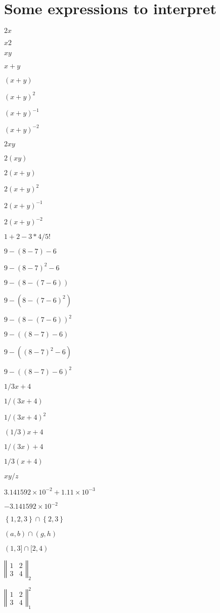 \documentclass{article}
\begin{document}
\section{Some expressions to interpret}

$2x$

$x2$

$xy$

$x+y$

$(x+y)$

$(x+y)^{2}$

$(x+y)^{-1}$

$(x+y)^{-2}$

$2xy$

$2(xy)$

$2(x+y)$

$2(x+y)^{2}$

$2(x+y)^{-1}$

$2(x+y)^{-2}$

$1+2-3\ast 4/5!$

$9-(8-7)-6$

$9-(8-7)^{2}-6$

$9-(8-(7-6))$

$9-(8-(7-6)^{2})$

$9-(8-(7-6))^{2}$

$9-((8-7)-6)$

$9-((8-7)^{2}-6)$

$9-((8-7)-6)^{2}$

$1/3x+4$

$1/\left( 3x+4\right) $

$1/\left( 3x+4\right) ^{2}$

$\left( 1/3\right) x+4$

$1/\left( 3x\right) +4$

$1/3\left( x+4\right) $

$xy/z$

$3.141592\times 10^{-2}+1.11\times 10^{-3}$

$-3.141592\times 10^{-2}$

$\left\{ 1,2,3\right\} \cap \left\{ 2,3\right\} $

$(a,b)\cap (g,h)$

$(1,3]\cap \lbrack 2,4)$

$\left\Vert 
\begin{array}{cc}
1 & 2 \\ 
3 & 4%
\end{array}%
\right\Vert _{2}$

$\left\Vert 
\begin{array}{cc}
1 & 2 \\ 
3 & 4%
\end{array}%
\right\Vert _{1}^{2}$
\end{document}
